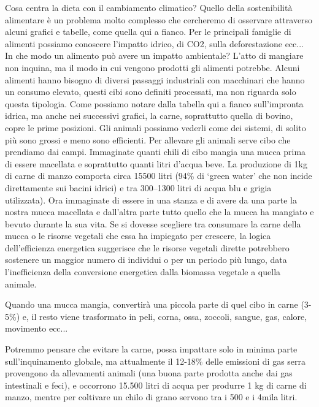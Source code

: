 \documentclass[12pt]{book} %
\begin{document}
Cosa centra la dieta con il cambiamento climatico? Quello della sostenibilità alimentare è un problema molto complesso che cercheremo di osservare attraverso alcuni grafici e tabelle, come quella qui a fianco. Per le principali famiglie di alimenti possiamo conoscere l'impatto idrico, di CO2, sulla deforestazione ecc... In che modo un alimento può avere un impatto ambientale? L'atto di mangiare non inquina, ma il modo in cui vengono prodotti gli alimenti potrebbe. Alcuni alimenti hanno bisogno di diversi passaggi industriali con macchinari che hanno un consumo elevato, questi cibi sono definiti processati, ma non riguarda solo questa tipologia. Come possiamo notare dalla tabella qui a fianco sull'impronta idrica, ma anche nei successivi grafici, la carne, soprattutto quella di bovino, copre le prime posizioni. Gli animali possiamo vederli come dei sistemi, di solito più sono grossi e meno sono efficienti. Per allevare gli animali serve cibo che prendiamo dai campi. Immaginate quanti chili di cibo mangia una mucca prima di essere macellata e soprattutto quanti litri d'acqua beve. La produzione di 1kg di carne di manzo comporta circa 15500 litri (94\% di ‘green water’ che non incide direttamente sui bacini idrici) e tra 300–1300 litri di acqua blu e grigia utilizzata). Ora immaginate di essere in una stanza e di avere da una parte
la nostra mucca macellata e dall'altra parte tutto quello che la mucca ha mangiato e bevuto durante la sua vita.
Se si dovesse scegliere tra consumare la carne della mucca o le risorse vegetali che essa ha impiegato per crescere, la logica dell'efficienza energetica suggerisce che le risorse vegetali dirette potrebbero sostenere un maggior numero di individui o per un periodo più lungo, data l'inefficienza della conversione energetica dalla biomassa vegetale a quella animale.

Quando una mucca mangia, convertirà una piccola parte di quel cibo in carne (3-5\%) e, il resto viene trasformato in peli, corna, ossa, zoccoli, sangue, gas, calore, movimento ecc...

Potremmo pensare che evitare la carne, possa impattare solo in minima parte sull'inquinamento globale, ma attualmente il 12-18\% delle emissioni di gas serra provengono da allevamenti animali
(una buona parte prodotta anche dai gas intestinali e feci), e occorrono 15.500 litri di acqua per produrre 1 kg di carne di manzo, mentre per coltivare un chilo di grano servono tra i 500 e i 4mila litri.
\end{document}
